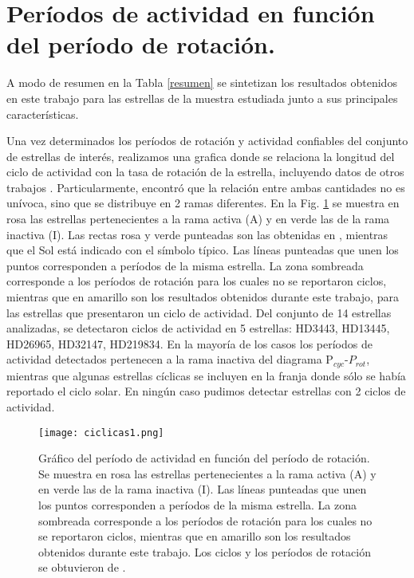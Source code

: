 \documentclass[baaa]{baaa}
\begin{document}
\section{Períodos de actividad en función del período de rotación.}

A modo de resumen en la Tabla \ref{resumen} se sintetizan los resultados obtenidos en este trabajo para las estrellas de la muestra estudiada junto a sus principales características.



Una vez determinados los períodos de rotación y actividad confiables del conjunto de estrellas de interés, realizamos una grafica donde se relaciona la longitud del ciclo de actividad con la tasa de rotación de la estrella, incluyendo datos de otros trabajos \citep{Saar99,Metcalfe10,Metcalfe13,Hall07,BohmVitense07}. Particularmente, \cite{BohmVitense07} encontró que la relación entre ambas cantidades no es unívoca, sino que se distribuye en 2 ramas diferentes. En la Fig. \ref{Metcalfe+hd} se muestra en rosa las estrellas pertenecientes a la rama activa (A) y en verde las de la rama inactiva (I). Las rectas rosa y verde punteadas son las obtenidas en \cite{BohmVitense07}, mientras que el Sol está indicado con el símbolo típico. Las líneas punteadas que unen los puntos corresponden a períodos de la misma estrella. La zona sombreada corresponde a los períodos de rotación para los cuales no se reportaron ciclos, mientras que en amarillo son los resultados obtenidos durante este trabajo, para las estrellas que presentaron un ciclo de actividad. Del conjunto de 14 estrellas analizadas, se detectaron ciclos de actividad en 5 estrellas: HD3443, HD13445, HD26965, HD32147, HD219834. En la mayoría de los casos los períodos de actividad detectados pertenecen a la rama inactiva del diagrama P$_{cyc}$-$P_{rot}$,  mientras que algunas estrellas cíclicas se incluyen en la franja donde sólo se había reportado el ciclo solar. En ningún caso pudimos detectar estrellas con 2 ciclos de actividad.

\begin{figure}
\centering
\texttt{[image: ciclicas1.png]}
\caption{Gráfico del período de actividad en función del período de rotación. Se muestra en rosa las estrellas pertenecientes a la rama activa (A) y en verde las de la rama inactiva (I). Las líneas punteadas que unen los puntos corresponden a períodos de la misma estrella. La zona sombreada corresponde a los períodos de rotación para los cuales no se reportaron ciclos, mientras que en amarillo son los resultados obtenidos durante este trabajo. Los ciclos y los períodos de rotación se obtuvieron de \cite{Saar99,Metcalfe10,Metcalfe13,Hall07,BohmVitense07}.}
\label{Metcalfe+hd}
\end{figure}
\end{document}
